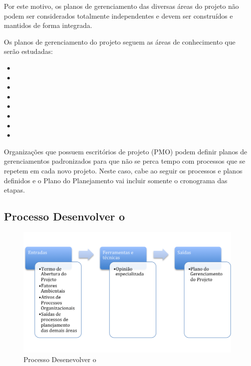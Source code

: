 Por este motivo, os planos de gerenciamento das diversas áreas do projeto não podem ser considerados totalmente independentes e devem ser construídos e mantidos de forma integrada.

Os planos de gerenciamento do projeto seguem as áreas de conhecimento que serão estudadas:

\begin{itemize}

\item \planesc
\item \plancron
\item \plancusto
\item \planqual
\item \planpess
\item \plancom
\item \planrisco
\item \planaq

\end{itemize}

Organizações que possuem escritórios de projeto (PMO) podem definir planos de gerenciamentos padronizados para que não se perca tempo com processos que se repetem em cada novo projeto. Neste caso, cabe ao \gp seguir os processos e planos definidos e o Plano do Planejamento vai incluir somente o cronograma das etapas.

\subsection{Processo Desenvolver o \planproj}

\begin{figure}[!h]
\centering
\includegraphics[scale=0.75]{Figuras/proc_integracao_1.png}
\caption{Processo Desenevolver o \planproj}
\label{fig:proc:des:planproj}
\end{figure}

